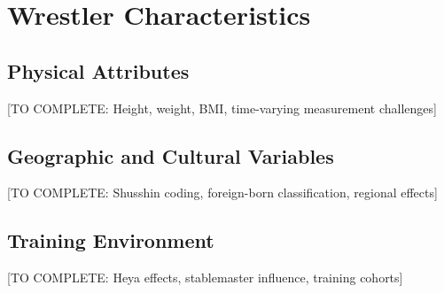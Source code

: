 \section{Wrestler Characteristics}

\subsection{Physical Attributes}

[TO COMPLETE: Height, weight, BMI, time-varying measurement challenges]

\subsection{Geographic and Cultural Variables}

[TO COMPLETE: Shusshin coding, foreign-born classification, regional effects]

\subsection{Training Environment}

[TO COMPLETE: Heya effects, stablemaster influence, training cohorts]